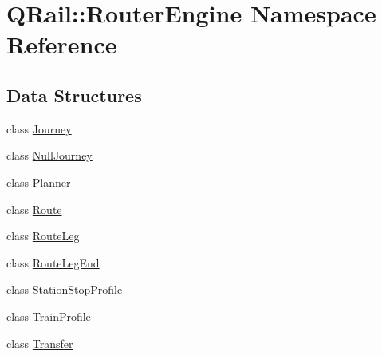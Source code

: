 \hypertarget{namespaceQRail_1_1RouterEngine}{}\section{Q\+Rail\+::Router\+Engine Namespace Reference}
\label{namespaceQRail_1_1RouterEngine}
\subsection*{Data Structures}
\begin{DoxyCompactItemize}
\item 
class \mbox{\hyperlink{classQRail_1_1RouterEngine_1_1Journey}{Journey}}
\item 
class \mbox{\hyperlink{classQRail_1_1RouterEngine_1_1NullJourney}{Null\+Journey}}
\item 
class \mbox{\hyperlink{classQRail_1_1RouterEngine_1_1Planner}{Planner}}
\item 
class \mbox{\hyperlink{classQRail_1_1RouterEngine_1_1Route}{Route}}
\item 
class \mbox{\hyperlink{classQRail_1_1RouterEngine_1_1RouteLeg}{Route\+Leg}}
\item 
class \mbox{\hyperlink{classQRail_1_1RouterEngine_1_1RouteLegEnd}{Route\+Leg\+End}}
\item 
class \mbox{\hyperlink{classQRail_1_1RouterEngine_1_1StationStopProfile}{Station\+Stop\+Profile}}
\item 
class \mbox{\hyperlink{classQRail_1_1RouterEngine_1_1TrainProfile}{Train\+Profile}}
\item 
class \mbox{\hyperlink{classQRail_1_1RouterEngine_1_1Transfer}{Transfer}}
\end{DoxyCompactItemize}
